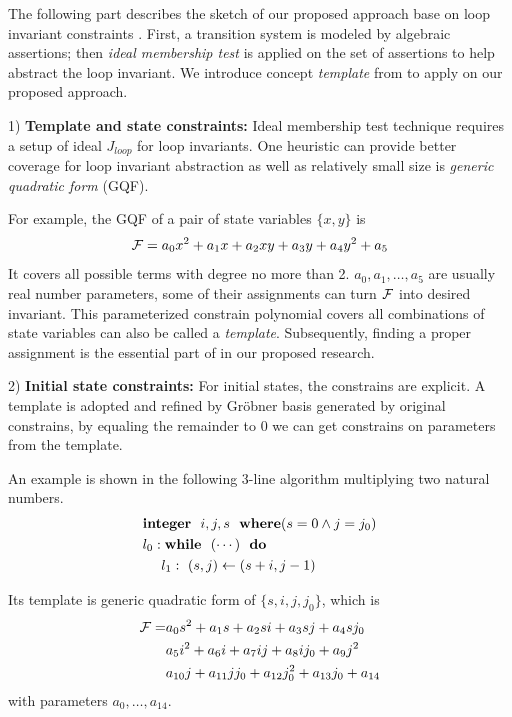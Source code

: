 The following part describes the sketch of our proposed approach base on loop invariant constraints \cite{sankaranarayanan2004non}.
First, a transition system is modeled by algebraic assertions; then \emph{ideal membership test} \cite{lv:phd}
is applied on the set of assertions to help abstract the loop invariant. We introduce concept \emph{template}
from \cite{sankaranarayanan2004non} to apply on our proposed approach.

1) {\bf Template and state constraints:}  Ideal membership test technique requires a setup of ideal $J_{loop}$
for loop invariants. 
One heuristic can provide better coverage for loop invariant abstraction as well as
relatively small size is \emph{generic quadratic form} (GQF).

For example, the GQF of a pair of state variables $\{x,y\}$ is
$${\mathcal{F}} = a_0x^2+a_1x+a_2xy+a_3y+a_4y^2+a_5$$
It covers all possible terms with degree no more than 2. $a_0,a_1,\dots, a_5$ are usually real number parameters,
some of their assignments can turn ${\mathcal{F}}$ into desired invariant. This parameterized constrain
polynomial covers all combinations of state variables can also be called a \emph{template}.
Subsequently, finding a proper assignment is the essential part of in our proposed research.

2) {\bf Initial state constraints:} For initial states, the constrains are explicit. A template is adopted and refined by Gr\"obner basis 
generated by original constrains, by equaling the remainder to 0 we can get constrains on
parameters from the template.

An example is shown in the following 3-line algorithm multiplying two natural numbers. 
\begin{align}
\label{eqn:loopinv}
& {\bf integer}~~i,j,s~~{\bf where}(s=0 \land j=j_0) \nonumber\\
& l_0: {\bf while}~~(\cdots)~~{\bf do} \nonumber\\
& ~~~~ l_1:~(s,j)\gets(s+i,j-1) 
\end{align}

Its template is generic quadratic form of $\{s,i,j,j_0\}$, which is
\begin{align}
{\mathcal{F}} = & a_0s^2+a_1s+a_2si+a_3sj+a_4sj_0\nonumber\\
&a_5i^2+a_6i+a_7ij+a_8ij_0+a_9j^2\nonumber\\
&a_{10}j+a_{11}jj_0+a_{12}j_0^2+a_{13}j_0+a_{14}\nonumber
\end{align}
with parameters $a_0,\dots,a_{14}$.

